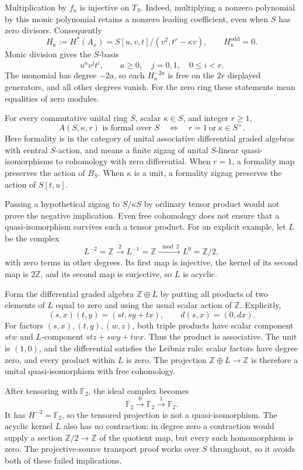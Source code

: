 Multiplication by $f_\kappa$ is injective on $T_S$.
Indeed, multiplying a nonzero polynomial by this monic polynomial
retains a nonzero leading coefficient, even when $S$ has zero divisors.
Consequently
\[
 H_\kappa:=H^*(A_\kappa)
 =S[u,v,t]/(v^2,t^r-\kappa v),\qquad H_\kappa^{\mathrm{odd}}=0.
\]
Monic division gives the $S$-basis
\[
 u^av^jt^i,\qquad a\geq0,\quad j=0,1,\quad 0\leq i<r.
\]
The monomial has degree $-2a$, so each $H_\kappa^{-2a}$ is free
on the $2r$ displayed generators, and all other degrees vanish.
For the zero ring these statements mean equalities of zero modules.

\begin{theorem}\label{thm:ha-ring-truncation-formality}
For every commutative unital ring $S$, scalar $\kappa\in S$, and
integer $r\geq1$,
\[
 A(S,\kappa,r)\text{ is formal over }S
 \quad\Longleftrightarrow\quad
 r=1\ \text{or}\ \kappa\in S^\times.
\]
Here formality is in the category of unital associative differential
graded algebras with central $S$-action, and means a finite zigzag
of unital $S$-linear quasi-isomorphisms to cohomology with zero differential.
When $r=1$, a formality map preserves the action of $B_S$.
When $\kappa$ is a unit, a formality zigzag preserves the action of $S[t,u]$.
\end{theorem}

Passing a hypothetical zigzag to $S/\kappa S$ by ordinary tensor
product would not prove the negative implication.
Even free cohomology does not ensure that a quasi-isomorphism
survives such a tensor product.
For an explicit example, let $L$ be the complex
\[
 L^{-2}=\mathbb Z\xrightarrow{\ 2\ }L^{-1}=\mathbb Z
 \xrightarrow{\ \bmod 2\ }L^0=\mathbb Z/2,
\]
with zero terms in other degrees.
Its first map is injective, the kernel of its second map is $2\mathbb Z$,
and its second map is surjective, so $L$ is acyclic.

Form the differential graded algebra $\mathbb Z\oplus L$ by
putting all products of two elements of $L$ equal to zero and
using the usual scalar action of $\mathbb Z$.
Explicitly,
\[
 (s,x)(t,y)=(st,sy+tx),\qquad d(s,x)=(0,dx).
\]
For factors $(s,x),(t,y),(w,z)$, both triple products have scalar
component $stw$ and $L$-component $stz+swy+twx$.
Thus the product is associative.
The unit is $(1,0)$, and the differential satisfies the Leibniz rule:
scalar factors have degree zero, and every product within $L$ is zero.
The projection $\mathbb Z\oplus L\to\mathbb Z$ is therefore a
unital quasi-isomorphism with free cohomology.

After tensoring with $\mathbb F_2$, the ideal complex becomes
\[
 \mathbb F_2\xrightarrow{\ 0\ }\mathbb F_2
 \xrightarrow{\ 1\ }\mathbb F_2.
\]
It has $H^{-2}=\mathbb F_2$, so the tensored projection is not
a quasi-isomorphism.
The acyclic kernel $L$ also has no contraction: in degree zero a
contraction would supply a section $\mathbb Z/2\to\mathbb Z$
of the quotient map, but every such homomorphism is zero.
The projective-source transport proof works over $S$ throughout,
so it avoids both of these failed implications.

